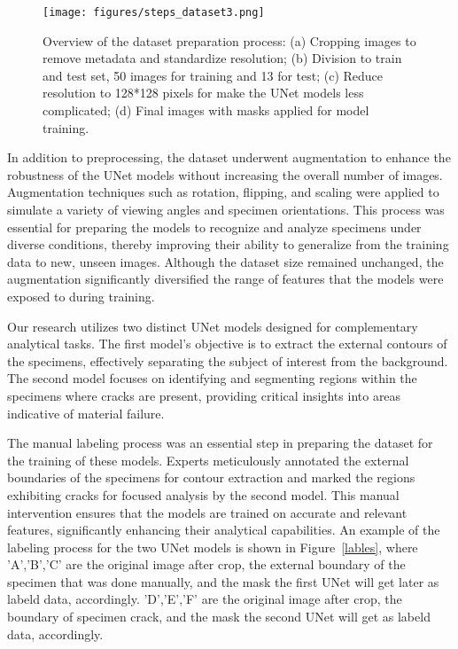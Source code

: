 \documentclass[preprint,12pt]{elsarticle}
\begin{document}
\begin{figure}[h!]
  \centering
  \texttt{[image: figures/steps\_dataset3.png]}
  \caption{Overview of the dataset preparation process: (a) Cropping images to remove metadata and standardize resolution; (b) Division to train and test set, 50 images for training and 13 for test; (c) Reduce resolution to 128*128 pixels for make the UNet models less complicated; (d) Final images with masks applied for model training.}
  \label{steps_was_done}
\end{figure}


In addition to preprocessing, the dataset underwent augmentation to enhance the robustness of the UNet models without increasing the overall number of images. Augmentation techniques such as rotation, flipping, and scaling were applied to simulate a variety of viewing angles and specimen orientations. This process was essential for preparing the models to recognize and analyze specimens under diverse conditions, thereby improving their ability to generalize from the training data to new, unseen images. Although the dataset size remained unchanged, the augmentation significantly diversified the range of features that the models were exposed to during training.
\vspace{\baselineskip}

Our research utilizes two distinct UNet models designed for complementary analytical tasks. The first model's objective is to extract the external contours of the specimens, effectively separating the subject of interest from the background. The second model focuses on identifying and segmenting regions within the specimens where cracks are present, providing critical insights into areas indicative of material failure.



The manual labeling process was an essential step in preparing the dataset for the training of these models. Experts meticulously annotated the external boundaries of the specimens for contour extraction and marked the regions exhibiting cracks for focused analysis by the second model. This manual intervention ensures that the models are trained on accurate and relevant features, significantly enhancing their analytical capabilities. An example of the labeling process for the two UNet models is shown in Figure~\ref{lables}, where 'A','B','C' are the original image after crop, the external boundary of the specimen that was done manually, and the mask the first UNet will get later as labeld data, accordingly.
'D','E','F' are the original image after crop, the boundary of specimen crack, and the mask the second UNet will get as labeld data, accordingly.
\end{document}
